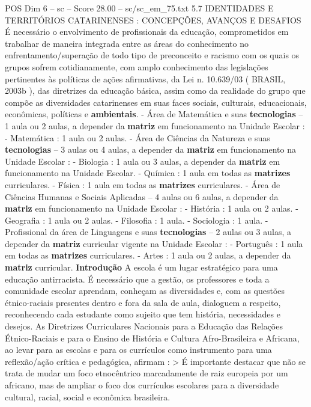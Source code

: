 \begin{textsample}{POS Dim 6 – sc – Score 28.00 – sc/sc\_em\_75.txt}  \label{ex:f6_pos_008}
5.7 IDENTIDADES E TERRITÓRIOS CATARINENSES : CONCEPÇÕES, AVANÇOS E DESAFIOS É necessário o envolvimento de profissionais da educação, comprometidos em trabalhar de maneira integrada entre as áreas do conhecimento no enfrentamento/superação de todo tipo de preconceito e racismo com os quais os grupos sofrem cotidianamente, com amplo conhecimento das legislações pertinentes às políticas de ações afirmativas, da Lei n. 10.639/03 ( BRASIL, 2003b ), das diretrizes da educação básica, assim como da realidade do grupo que compõe as diversidades catarinenses em suas faces sociais, culturais, educacionais, econômicas, políticas e \textbf{ambientais}. - Área de Matemática e suas \textbf{tecnologias} – 1 aula ou 2 aulas, a depender da \textbf{matriz} em funcionamento na Unidade Escolar : - Matemática : 1 aula ou 2 aulas. - Área de Ciências da Natureza e suas \textbf{tecnologias} – 3 aulas ou 4 aulas, a depender da \textbf{matriz} em funcionamento na Unidade Escolar : - Biologia : 1 aula ou 3 aulas, a depender da \textbf{matriz} em funcionamento na Unidade Escolar. - Química : 1 aula em todas as \textbf{matrizes} curriculares. - Física : 1 aula em todas as \textbf{matrizes} curriculares. - Área de Ciências Humanas e Sociais Aplicadas – 4 aulas ou 6 aulas, a depender da \textbf{matriz} em funcionamento na Unidade Escolar : - História : 1 aula ou 2 aulas. - Geografia : 1 aula ou 2 aulas. - Filosofia : 1 aula. - Sociologia : 1 aula. - Profissional da área de Linguagens e suas \textbf{tecnologias} – 2 aulas ou 3 aulas, a depender da \textbf{matriz} curricular vigente na Unidade Escolar : - Português : 1 aula em todas as \textbf{matrizes} curriculares. - Artes : 1 aula ou 2 aulas, a depender da \textbf{matriz} curricular. \textbf{Introdução} A escola é um lugar estratégico para uma educação antirracista.
É necessário que a gestão, os professores e toda a comunidade escolar aprendam, conheçam as diversidades e, com as questões étnico-raciais presentes dentro e fora da sala de aula, dialoguem a respeito, reconhecendo cada estudante como sujeito que tem história, necessidades e desejos.
As Diretrizes Curriculares Nacionais para a Educação das Relações Étnico-Raciais e para o Ensino de História e Cultura Afro-Brasileira e Africana, ao levar para as escolas e para os currículos como instrumento para uma reflexão/ação crítica e pedagógica, afirmam : > É importante destacar que não se trata de mudar um foco etnocêntrico marcadamente de raiz europeia por um africano, mas de ampliar o foco dos currículos escolares para a diversidade cultural, racial, social e econômica brasileira.

\end{textsample}
